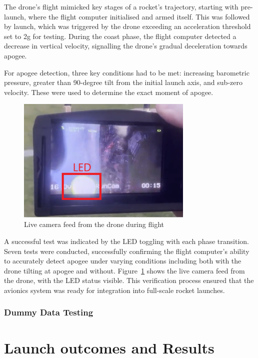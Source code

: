 The drone's flight mimicked key stages of a rocket's trajectory, starting with pre-launch, where the flight computer initialised and armed itself. This was followed by launch, which was triggered by the drone exceeding an acceleration threshold set to 2g for testing. During the coast phase, the flight computer detected a decrease in vertical velocity, signalling the drone's gradual deceleration towards apogee. 

For apogee detection, three key conditions had to be met: increasing barometric pressure, greater than 90-degree tilt from the initial launch axis, and sub-zero velocity. These were used to determine the exact moment of apogee. 

\begin{figure}[h]
    \begin{center}
        \includegraphics[width=0.75\textwidth]{./img/drone_led}
    \end{center}
    \caption{Live camera feed from the drone during flight}\label{fig:drone_led}
\end{figure}

A successful test was indicated by the LED toggling with each phase transition. Seven tests were conducted, successfully confirming the flight computer’s ability to accurately detect apogee under varying conditions including both with the drone tilting at apogee and without. Figure~\ref{fig:drone_led} shows the live camera feed from the drone, with the LED status visible. This verification process ensured that the avionics system was ready for integration into full-scale rocket launches. 

\subsubsection{Dummy Data Testing}

\section{Launch outcomes and Results}
